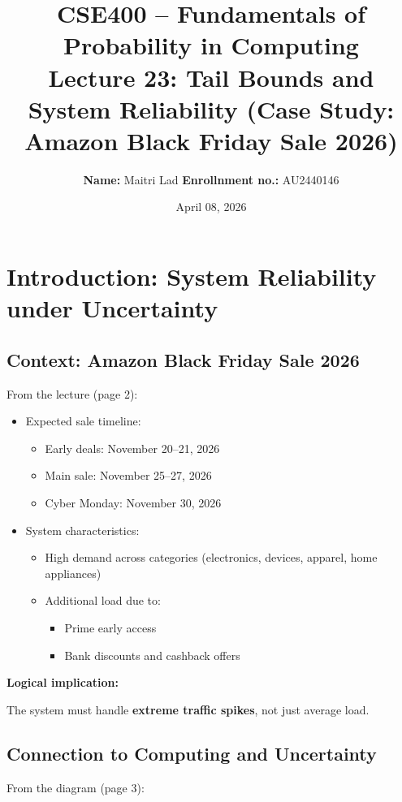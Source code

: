 \documentclass[11pt]{article}
\title{\textbf{CSE400 -- Fundamentals of Probability in Computing}\\
\large Lecture 23: Tail Bounds and System Reliability (Case Study: Amazon Black Friday Sale 2026)}
\author{\textbf{Name:} Maitri Lad
\textbf{Enrollnment no.:} AU2440146}
\date{April 08, 2026}
\begin{document}
\maketitle

\section{Introduction: System Reliability under Uncertainty}

\subsection{Context: Amazon Black Friday Sale 2026}

From the lecture (page 2):

\begin{itemize}
\item Expected sale timeline:
\begin{itemize}
\item Early deals: November 20--21, 2026
\item Main sale: November 25--27, 2026
\item Cyber Monday: November 30, 2026
\end{itemize}

\item System characteristics:
\begin{itemize}
\item High demand across categories (electronics, devices, apparel, home appliances)
\item Additional load due to:
\begin{itemize}
\item Prime early access
\item Bank discounts and cashback offers
\end{itemize}
\end{itemize}
\end{itemize}

\textbf{Logical implication:}

The system must handle \textbf{extreme traffic spikes}, not just average load.

\subsection{Connection to Computing and Uncertainty}

From the diagram (page 3):
\end{document}
